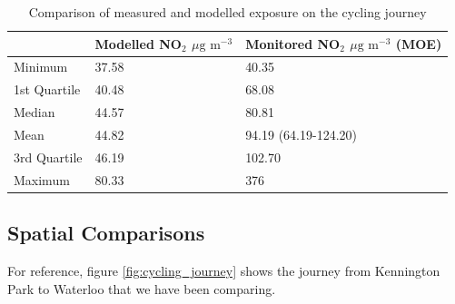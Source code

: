 \begin{table}[H]
\centering
    \begin{tabular}{ | l | l | l |}
    \hline 
        & \bfseries{Modelled NO$_{2}$ $\mu \text{g m}^{-3}$} & \bfseries{Monitored NO$_{2}$ $\mu \text{g m}^{-3}$ (MOE)}                \\ \hline
     Minimum         & 37.58 & 40.35                \\ \hline
     1st Quartile    & 40.48 &  68.08               \\ \hline
     Median          & 44.57 & 80.81                \\ \hline
     Mean            & 44.82 & 94.19 (64.19-124.20) \\ \hline
     3rd Quartile    & 46.19 & 102.70               \\ \hline
     Maximum         & 80.33 & 376                  \\ \hline
    \end{tabular}
\caption{Comparison of measured and modelled exposure on the cycling journey}
\label{tab:modelled_monitored_cycling_summary}
\end{table}

\subsection{Spatial Comparisons}
\label{subsec:spatialcomparisons}

For reference, figure \ref{fig:cycling_journey} shows the journey from Kennington Park to Waterloo that we have been comparing.

